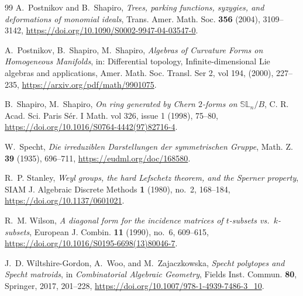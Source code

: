 \documentclass[12pt]{amsart}
\theoremstyle{definition}
\theoremstyle{remark}
\begin{document}
\begin{thebibliography}{99}
A.~Postnikov and B.~Shapiro,
\emph{Trees, parking functions, syzygies, and deformations of monomial ideals},
Trans. Amer. Math. Soc. \textbf{356} (2004), 3109--3142,
\url{https://doi.org/10.1090/S0002-9947-04-03547-0}.

A.~Postnikov, B.~Shapiro,  M.~Shapiro,
\emph{Algebras of Curvature Forms on Homogeneous Manifolds},
in: Differential topology, Infinite-dimensional Lie algebras and applications,
Amer. Math. Soc. Transl. Ser 2, vol 194, (2000), 227--235,
\url{https://arxiv.org/pdf/math/9901075}.

B.~Shapiro,  M.~Shapiro,
\emph{On ring generated by Chern  $2$-forms on $\mathbb {SL}_n/B$},
C. R.  Acad. Sci. Paris S\'er. I  Math. vol 326, issue 1 (1998), 75--80,
\url{https://doi.org/10.1016/S0764-4442(97)82716-4}.

W.~Specht,
\emph{Die irreduziblen Darstellungen der symmetrischen Gruppe},
Math. Z. \textbf{39} (1935), 696--711,
\url{https://eudml.org/doc/168580}.

R.~P. Stanley,
\emph{Weyl groups, the hard Lefschetz theorem, and the Sperner property},
SIAM J. Algebraic Discrete Methods \textbf{1} (1980), no.~2, 168--184,
\url{https://doi.org/10.1137/0601021}.

R.~M. Wilson,
\emph{A diagonal form for the incidence matrices of $t$-subsets vs.\ $k$-subsets},
European J. Combin. \textbf{11} (1990), no.~6, 609--615,
\url{https://doi.org/10.1016/S0195-6698(13)80046-7}.

J.~D. Wiltshire-Gordon, A.~Woo, and M.~Zajaczkowska,
\emph{Specht polytopes and Specht matroids},
in \emph{Combinatorial Algebraic Geometry}, Fields Inst. Commun. \textbf{80},
Springer, 2017, 201--228,
\url{https://doi.org/10.1007/978-1-4939-7486-3_10}.

\end{thebibliography}
\end{document}
